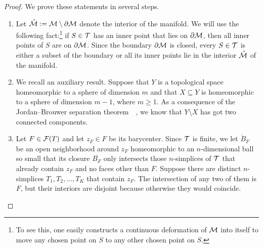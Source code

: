 \documentclass[10pt,letterpaper]{article}
\begin{document}
\begin{proof}
    We prove these statements in several steps.
    \begin{enumerate}
    \item 
    Let $\mathring {{\mathcal M}} := {\mathcal M} \setminus \partial {\mathcal M}$ denote the interior of the manifold. 
    We will use the following fact:\footnote{To see this, one easily constructs a continuous deformation of ${\mathcal M}$ into itself to move any chosen point on $S$ to any other chosen point on $S$.} if $S \in {\mathcal T}$ has an inner point that lies on $\partial {\mathcal M}$, then all inner points of $S$ are on $\partial {\mathcal M}$. 
    Since the boundary $\partial {\mathcal M}$ is closed, every $S \in {\mathcal T}$ is either a subset of the boundary or all its inner points lie in the interior $\mathring {{\mathcal M}}$ of the manifold. 
    
    \item 
    We recall an auxiliary result.
    Suppose that $Y$ is a topological space homeomorphic to a sphere of dimension $m$ and that $X \subseteq Y$ is homeomorphic to a sphere of dimension $m-1$, where $m \geq 1$. 
    As a consequence of the Jordan--Brouwer separation theorem~\cite[Corollary IV.5.24]{mayer1989algebraische}~\cite[Corollary VIII.6.4]{massey1981algebraic}, 
    we know that $Y \setminus X$ has got two connected components.
    
    
    \item
    Let $F \in {\mathcal F}(T)$ and let $z_F \in F$ be its barycenter. 
    Since ${\mathcal T}$ is finite, we let $\mathring B_F$ be an open neighborhood around $z_F$ 
    homeomorphic to an $n$-dimensional ball 
    so small that its closure $\overline{B_F}$ only intersects those $n$-simplices of ${\mathcal T}$ that already contain $z_F$ and no faces other than $F$.
    Suppose there are distinct $n$-simplices $T_1, T_2, \dots, T_K$ that contain $z_F$. 
    The intersection of any two of them is $F$, but their interiors are disjoint because otherwise they would coincide. 
    

\end{enumerate}
\end{proof}
\end{document}

